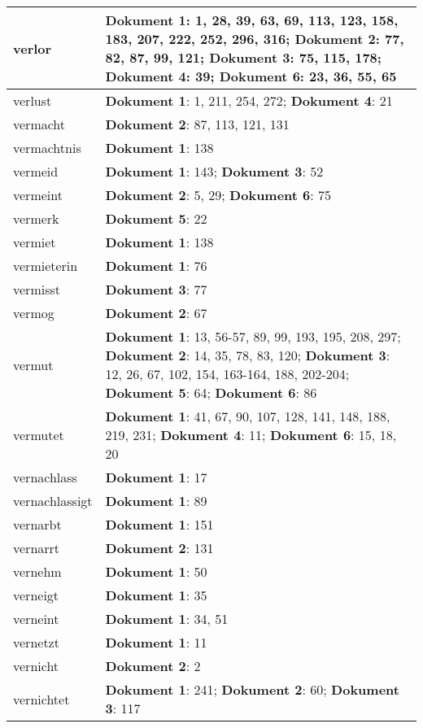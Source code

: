 \documentclass[a5paper]{article}
\begin{document}
\begin{longtable}[l]{|l|p{3in}|}
\hline
verlor & \textbf{Dokument 1}: 1, 28, 39, 63, 69, 113, 123, 158, 183, 207, 222, 252, 296, 316; \textbf{Dokument 2}: 77, 82, 87, 99, 121; \textbf{Dokument 3}: 75, 115, 178; \textbf{Dokument 4}: 39; \textbf{Dokument 6}: 23, 36, 55, 65 \\
\hline
verlust & \textbf{Dokument 1}: 1, 211, 254, 272; \textbf{Dokument 4}: 21 \\
\hline
vermacht & \textbf{Dokument 2}: 87, 113, 121, 131 \\
\hline
vermachtnis & \textbf{Dokument 1}: 138 \\
\hline
vermeid & \textbf{Dokument 1}: 143; \textbf{Dokument 3}: 52 \\
\hline
vermeint & \textbf{Dokument 2}: 5, 29; \textbf{Dokument 6}: 75 \\
\hline
vermerk & \textbf{Dokument 5}: 22 \\
\hline
vermiet & \textbf{Dokument 1}: 138 \\
\hline
vermieterin & \textbf{Dokument 1}: 76 \\
\hline
vermisst & \textbf{Dokument 3}: 77 \\
\hline
vermog & \textbf{Dokument 2}: 67 \\
\hline
vermut & \textbf{Dokument 1}: 13, 56-57, 89, 99, 193, 195, 208, 297; \textbf{Dokument 2}: 14, 35, 78, 83, 120; \textbf{Dokument 3}: 12, 26, 67, 102, 154, 163-164, 188, 202-204; \textbf{Dokument 5}: 64; \textbf{Dokument 6}: 86 \\
\hline
vermutet & \textbf{Dokument 1}: 41, 67, 90, 107, 128, 141, 148, 188, 219, 231; \textbf{Dokument 4}: 11; \textbf{Dokument 6}: 15, 18, 20 \\
\hline
vernachlass & \textbf{Dokument 1}: 17 \\
\hline
vernachlassigt & \textbf{Dokument 1}: 89 \\
\hline
vernarbt & \textbf{Dokument 1}: 151 \\
\hline
vernarrt & \textbf{Dokument 2}: 131 \\
\hline
vernehm & \textbf{Dokument 1}: 50 \\
\hline
verneigt & \textbf{Dokument 1}: 35 \\
\hline
verneint & \textbf{Dokument 1}: 34, 51 \\
\hline
vernetzt & \textbf{Dokument 1}: 11 \\
\hline
vernicht & \textbf{Dokument 2}: 2 \\
\hline
vernichtet & \textbf{Dokument 1}: 241; \textbf{Dokument 2}: 60; \textbf{Dokument 3}: 117 \\

\end{longtable}
\end{document}
